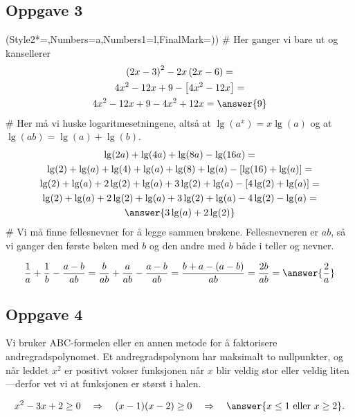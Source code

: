 \subsection*{Oppgave 3}
\begin{easylist}[enumerate]
	\ListProperties(Style2*=,Numbers=a,Numbers1=l,FinalMark={)})
	# Her ganger vi bare ut og kansellerer
	\begin{gather*}
		\left( 2x - 3\right)^2 - 2x \left(2x - 6\right) =\\
		4x^2 - 12x + 9 - \left[ 4x^2 - 12x\right] =\\
		4x^2 - 12x + 9 -  4x^2 + 12x = \answer{9}
	\end{gather*}
	# Her må vi huske logaritmesetningene, altså at $\lg (a^x) = x \lg (a)$ og at $\lg \left(a b\right) = \lg (a) + \lg (b)$.
	\begin{gather*}
		\lg (2a) + \lg (4a) + \lg (8a) - \lg (16a) =\\
		\lg (2) + \lg (a) + \lg (4) + \lg (a) + \lg (8) +\lg (a) - \left[\lg (16) + \lg (a)\right] =\\ 
		\lg (2) + \lg (a) + 2\lg (2) + \lg (a) + 3\lg (2) +\lg (a) - \left[4 \lg (2) + \lg (a)\right] =\\
		\lg (2) + \lg (a) + 2\lg (2) + \lg (a) + 3\lg (2) +\lg (a) - 4 \lg (2) - \lg (a) =\\
		\answer{3 \lg (a) + 2 \lg (2)}
	\end{gather*}
	# Vi må finne fellesnevner for å legge sammen brøkene. Fellesnevneren er $ab$, så vi ganger den første bøken med $b$ og den andre med $b$ både i teller og nevner.
	
	\begin{equation*}
		\frac{1}{a} + \frac{1}{b} - \frac{a - b}{ab} =
		\frac{b}{ab} + \frac{a}{ab} - \frac{a - b}{ab} =
		\frac{b + a - (a - b)}{ab} =
		\frac{2b}{ab} = \answer{\frac{2}{a}} 
	\end{equation*}
\end{easylist}

\subsection*{Oppgave 4}
Vi bruker ABC-formelen eller en annen metode for å faktorisere andregradspolynomet. Et andregradspolynom har maksimalt to nullpunkter, og når leddet $x^2$ er positivt vokser funksjonen når $x$ blir veldig stor eller veldig liten---derfor vet vi at funksjonen er størst i halen.

\begin{equation*}
	x^2 - 3x + 2 \geq 0 
	\quad \Rightarrow \quad ( x - 1)(x - 2) \geq 0
	\quad \Rightarrow \quad \answer{x \leq 1 \text{ eller } x \geq 2}.
\end{equation*}

